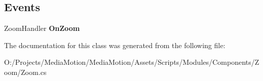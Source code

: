\subsection*{Events}
\begin{DoxyCompactItemize}
\item 
\hypertarget{class_media_motion_1_1_modules_1_1_components_1_1_zoom_1_1_zoom_a708fe5bd74db3942d16ede7ac4da75e3}{Zoom\+Handler {\bfseries On\+Zoom}}\label{class_media_motion_1_1_modules_1_1_components_1_1_zoom_1_1_zoom_a708fe5bd74db3942d16ede7ac4da75e3}

\end{DoxyCompactItemize}


The documentation for this class was generated from the following file\+:\begin{DoxyCompactItemize}
\item 
O\+:/\+Projects/\+Media\+Motion/\+Media\+Motion/\+Assets/\+Scripts/\+Modules/\+Components/\+Zoom/Zoom.\+cs\end{DoxyCompactItemize}

